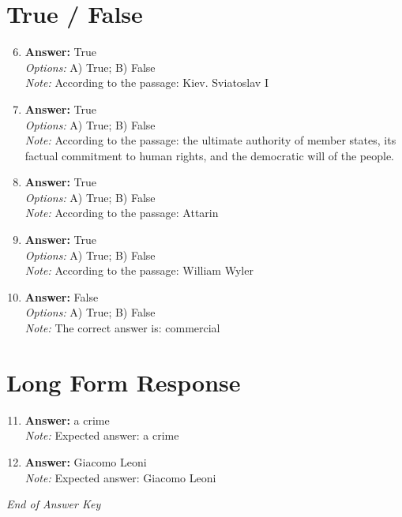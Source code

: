 \documentclass[12pt]{article}
\begin{document}
\section*{True / False}
\begin{enumerate}[label=\arabic*.]
\setcounter{enumi}{5}
\item \textbf{Answer:} True
\\ \textit{Options:} A) True; B) False
\\ \textit{Note:} According to the passage: Kiev. Sviatoslav I
\item \textbf{Answer:} True
\\ \textit{Options:} A) True; B) False
\\ \textit{Note:} According to the passage: the ultimate authority of member states, its factual commitment to human rights, and the democratic will of the people.
\item \textbf{Answer:} True
\\ \textit{Options:} A) True; B) False
\\ \textit{Note:} According to the passage: Attarin
\item \textbf{Answer:} True
\\ \textit{Options:} A) True; B) False
\\ \textit{Note:} According to the passage: William Wyler
\item \textbf{Answer:} False
\\ \textit{Options:} A) True; B) False
\\ \textit{Note:} The correct answer is: commercial
\end{enumerate}

\section*{Long Form Response}
\begin{enumerate}[label=\arabic*.]
\setcounter{enumi}{10}
\item \textbf{Answer:} a crime
\\ \textit{Note:} Expected answer: a crime
\item \textbf{Answer:} Giacomo Leoni
\\ \textit{Note:} Expected answer: Giacomo Leoni
\end{enumerate}

\vfill
\noindent\textit{End of Answer Key}
\end{document}
